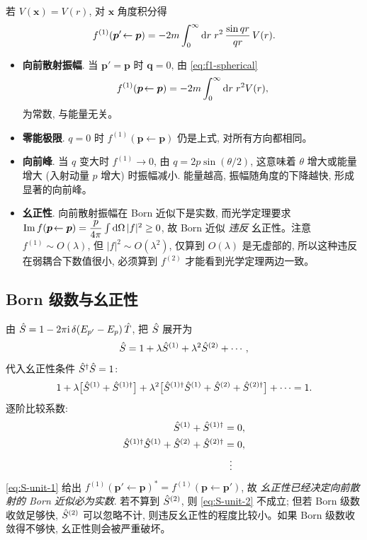 若 $V(\bm x)=V(r)$, 对 $\bm x$ 角度积分得
\begin{equation}
f^{(1)}(\bm p'\!\leftarrow\bm p)=-2m\int_{0}^{\infty}\mathrm{d} r\;r^{2}\,\frac{\sin qr}{qr}\,V(r).
\label{eq:f1-spherical}
\end{equation}

\begin{remark}
\begin{itemize}
  \item \textbf{向前散射振幅}. 当 $\bm p'=\bm p$ 时 $\bm q=0$, 由 \eqref{eq:f1-spherical}
\begin{equation}
f^{(1)}(\bm p\!\leftarrow\bm p)=-2m\int_{0}^{\infty}\mathrm{d} r\;r^{2}V(r),
\end{equation}
为常数, 与能量无关。
  \item \textbf{零能极限}. $q=0$ 时 $f^{(1)}(\bm p\!\leftarrow\bm p)$ 仍是上式, 对所有方向都相同。
  \item \textbf{向前峰}. 当 $q$ 变大时 $f^{(1)}\to 0$, 由 $q=2p\sin(\theta/2)$, 这意味着 $\theta$ 增大或能量增大 (入射动量 $p$ 增大) 时振幅减小. 能量越高, 振幅随角度的下降越快, 形成显著的向前峰。
  \item \textbf{幺正性}. 向前散射振幅在 Born 近似下是实数, 而光学定理要求 $\mathrm{Im}\,f(\bm p\!\leftarrow\bm p)=\dfrac{p}{4\pi}\int\mathrm{d}\Omega\,|f|^{2}\ge 0$, 故 Born 近似 \emph{违反} 幺正性。注意 $f^{(1)}\sim O(\lambda)$, 但 $|f|^{2}\sim O(\lambda^{2})$, 仅算到 $O(\lambda)$ 是无虚部的, 所以这种违反在弱耦合下数值很小, 必须算到 $f^{(2)}$ 才能看到光学定理两边一致。
\end{itemize}
\end{remark}

\subsection{Born 级数与幺正性}

由 $\hat{S}=1-2\pi\mathrm{i}\,\delta(E_{p'}-E_{p})\,\hat{T}$, 把 $\hat{S}$ 展开为
\begin{equation}
\hat{S}=1+\lambda \hat{S}^{(1)}+\lambda^{2}\hat{S}^{(2)}+\cdots ,
\end{equation}
代入幺正性条件 $\hat{S}^{\dagger}\hat{S}=1$:
\begin{equation}
1+\lambda\bigl[\hat{S}^{(1)}+\hat{S}^{(1)\dagger}\bigr]
+\lambda^{2}\bigl[\hat{S}^{(1)\dagger}\hat{S}^{(1)}+\hat{S}^{(2)}+\hat{S}^{(2)\dagger}\bigr]+\cdots=1.
\end{equation}
逐阶比较系数:
\begin{align}
\hat{S}^{(1)}+\hat{S}^{(1)\dagger}&=0,\label{eq:S-unit-1}\\
\hat{S}^{(1)\dagger}\hat{S}^{(1)}+\hat{S}^{(2)}+\hat{S}^{(2)\dagger}&=0,\label{eq:S-unit-2}\\
&\;\;\vdots\notag
\end{align}
\eqref{eq:S-unit-1} 给出 $f^{(1)}(\bm p'\!\leftarrow\bm p)^{*}=f^{(1)}(\bm p\!\leftarrow\bm p')$, 故 \emph{幺正性已经决定向前散射的 Born 近似必为实数}. 若不算到 $\hat{S}^{(2)}$, 则 \eqref{eq:S-unit-2} 不成立; 但若 Born 级数收敛足够快, $\hat{S}^{(2)}$ 可以忽略不计, 则违反幺正性的程度比较小。如果 Born 级数收敛得不够快, 幺正性则会被严重破坏。

